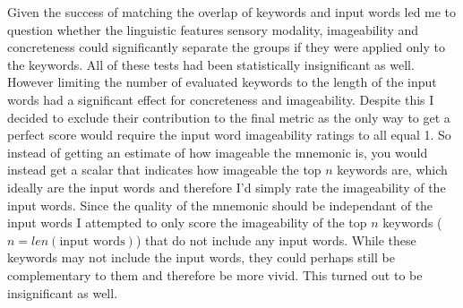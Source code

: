 Given the success of matching the overlap of keywords and input words led me to question whether the linguistic features sensory modality, imageability and concreteness could significantly separate the groups if they were applied only to the keywords. All of these tests had been statistically insignificant as well. However limiting the number of evaluated keywords to the length of the input words had a significant effect for concreteness and imageability. Despite this I decided to exclude their contribution to the final metric as the only way to get a perfect score would require the input word imageability ratings to all equal 1. So instead of getting an estimate of how imageable the mnemonic is, you would instead get a scalar that indicates how imageable the top $n$ keywords are, which ideally are the input words and therefore I'd simply rate the imageability of the input words. Since the quality of the mnemonic should be independant of the input words I attempted to only score the imageability of the top $n$ keywords ($n = len(\text{input words})$) that do not include any input words. While these keywords may not include the input words, they could perhaps still be complementary to them and therefore be more vivid. This turned out to be insignificant as well.


